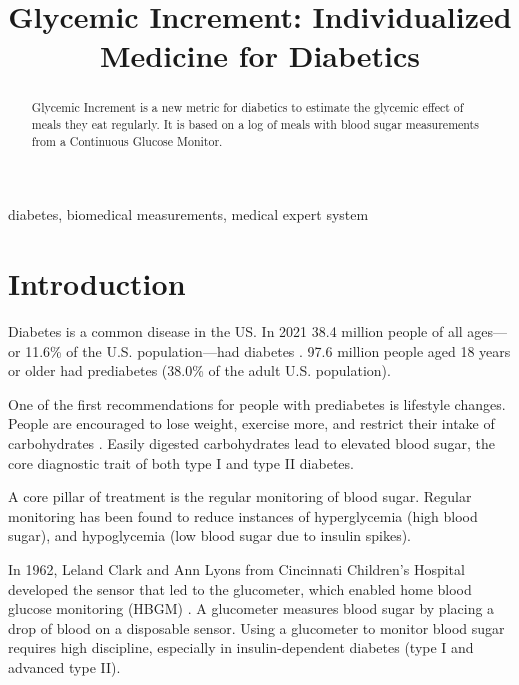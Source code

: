 \documentclass[conference]{IEEEtran}
\begin{document}
\title{Glycemic Increment: Individualized Medicine for Diabetics
}

\author{
\and
{}
}
\maketitle

\begin{abstract}
Glycemic Increment is a new metric for diabetics to estimate the glycemic effect of meals they eat regularly. It is based on a log of meals with blood sugar measurements from a Continuous Glucose Monitor.
\end{abstract}

\begin{IEEEkeywords}
diabetes, biomedical measurements, medical expert system
\end{IEEEkeywords}

\section{Introduction}
Diabetes is a common disease in the US. In 2021 38.4 million people of all ages—or 11.6\% of the U.S. population—had diabetes \cite{CDC_2024}. 97.6 million people aged 18 years or older had prediabetes (38.0\% of the adult U.S. population).

One of the first recommendations for people with prediabetes is lifestyle changes. People are encouraged to lose weight, exercise more, and restrict their intake of carbohydrates \cite{CDC_2024b}. Easily digested carbohydrates lead to elevated blood sugar, the core diagnostic trait of both type I and type II diabetes.

A core pillar of treatment is the regular monitoring of blood sugar. Regular monitoring has been found to reduce instances of hyperglycemia (high blood sugar), and hypoglycemia (low blood sugar due to insulin spikes).

In 1962, Leland Clark and Ann Lyons from Cincinnati Children's Hospital developed the sensor that led to the glucometer, which enabled home blood glucose monitoring (HBGM) \cite{Clark_1962}. A glucometer measures blood sugar by placing a drop of blood on a disposable sensor. Using a glucometer to monitor blood sugar requires high discipline, especially in insulin-dependent diabetes (type I and advanced type II).
\end{document}
